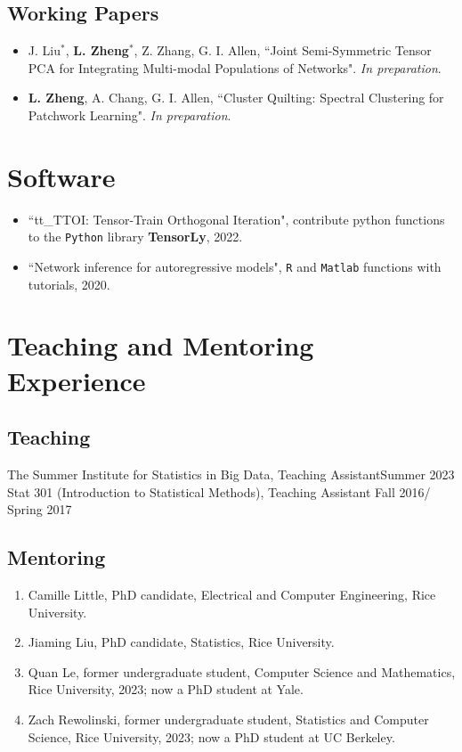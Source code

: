 \documentclass[letterpaper,11pt]{article}
\begin{document}
	\subsection*{Working Papers}
	\begin{itemize}
		\item J. Liu$^{*}$, {\bf L. Zheng}$^{*}$, Z. Zhang, G. I. Allen, ``Joint Semi-Symmetric Tensor PCA for Integrating Multi-modal Populations of Networks". {\em In preparation}.
		\item {\bf L. Zheng}, A. Chang, G. I. Allen, ``Cluster Quilting: Spectral Clustering for Patchwork Learning". {\em In preparation}.
	\end{itemize}
	\section{Software}
	\begin{itemize}
		\item ``tt\_TTOI: Tensor-Train Orthogonal Iteration", contribute python functions to the \verb|Python| library {\bf TensorLy}, 2022.
		\item ``Network inference for autoregressive models", \verb|R| and \verb|Matlab| functions with tutorials, 2020.
	\end{itemize}
	\section{Teaching and Mentoring Experience}
	\subsection*{Teaching}
	The Summer Institute for Statistics in Big Data, Teaching Assistant\hfill Summer 2023\\
	Stat 301 (Introduction to Statistical Methods), Teaching Assistant \hfill Fall 2016/ Spring 2017
	\subsection*{Mentoring}
	\begin{enumerate}
		\item Camille Little, PhD candidate, Electrical and Computer Engineering, Rice University.
		\item Jiaming Liu, PhD candidate, Statistics, Rice University.
		\item Quan Le, former undergraduate student, Computer Science and Mathematics, Rice University, 2023; now a PhD student at Yale.
		\item Zach Rewolinski, former undergraduate student, Statistics and Computer Science, Rice University, 2023; now a PhD student at UC Berkeley.
	\end{enumerate}
\end{document}
